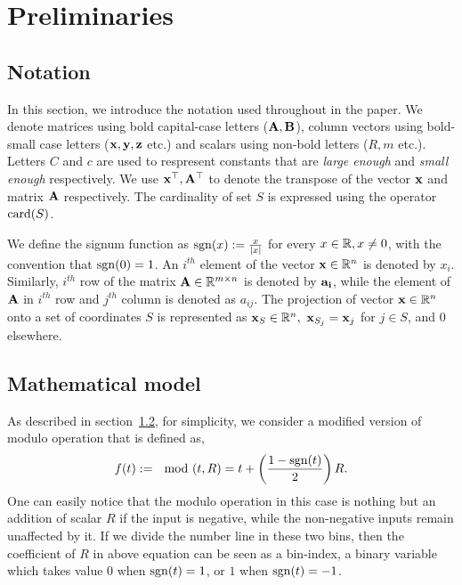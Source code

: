 \section{Preliminaries}
\label{sec:prelim}
\subsection{Notation}
\label{subsec:nota}
In this section, we introduce the notation used throughout in the paper. We denote matrices using bold capital-case letters ($\mathbf{A,B}$), column vectors using bold-small case letters ($\mathbf{x,y,z}$ etc.) and scalars using non-bold letters ($R,m$ etc.). Letters $C$ and $c$ are used to respresent constants that are \textit{large enough} and \textit{small enough} respectively. We use $\mathbf{x}^\top,\mathbf{A}^\top$ to denote the transpose of the vector $\mathbf{x}$ and matrix $\mathbf{A}$ respectively. The cardinality of set $S$ is expressed using the operator $\mathrm{card}(S)$.

We define the signum function as $\mathrm{sgn}(x) := \frac{x}{|x|}$ for every $x \in {\mathbb{R}}, x \neq 0$, with the convention that $\mathrm{sgn}(0)=1$.
An $i^{th}$ element of the vector $\mathbf{x} \in {\mathbb{R}}^n$ is denoted by $x_{i}$. Similarly, $i^{th}$ row of the matrix $\mathbf{A} \in {\mathbb{R}}^{m \times n}$ is denoted by $\mathbf{a_i}$, while the element of $\mathbf{A}$ in $i^{th}$ row and $j^{th}$ column is denoted as $a_{ij}$. The projection of vector $\mathbf{x} \in {\mathbb{R}}^n$ onto a set of coordinates $S$ is represented as $\mathbf{x}_S \in {\mathbb{R}}^n,~\mathbf{x}_{S_j} = \mathbf{x}_j$ for $j \in S$, and $0$ elsewhere. 


\subsection{Mathematical model}
\label{subsec:model}
As described in section~\ref{subsec:model}, for simplicity, we consider a modified version of modulo operation that is defined as, 
$$
f(t) :=\mod(t,R) = t+\left( \frac{1-\mathrm{sgn}(t)}{2}\right)R.
$$
One can easily notice that the modulo operation in this case is nothing but an addition of scalar $R$ if the input is negative, while the non-negative inputs remain unaffected by it. If we divide the number line in these two bins, then the coefficient of $R$ in above equation can be seen as a bin-index, a binary variable which takes value $0$ when $\mathrm{sgn}(t)=1$, or $1$ when $\mathrm{sgn}(t)=-1$.

